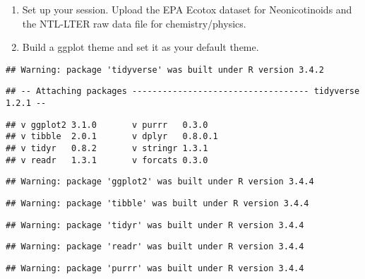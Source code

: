 \documentclass[]{article}
\newenvironment{Shaded}{\begin{snugshade}}{\end{snugshade}}
\newcommand{\KeywordTok}[1]{\textcolor[rgb]{0.13,0.29,0.53}{\textbf{#1}}}
\newcommand{\CommentTok}[1]{\textcolor[rgb]{0.56,0.35,0.01}{\textit{#1}}}
\newcommand{\NormalTok}[1]{#1}
\begin{document}
\begin{enumerate}
\def\labelenumi{\arabic{enumi}.}
\item
  Set up your session. Upload the EPA Ecotox dataset for Neonicotinoids
  and the NTL-LTER raw data file for chemistry/physics.
\item
  Build a ggplot theme and set it as your default theme.
\end{enumerate}

\begin{Shaded}
\end{Shaded}

\begin{verbatim}
## Warning: package 'tidyverse' was built under R version 3.4.2
\end{verbatim}

\begin{verbatim}
## -- Attaching packages ----------------------------------- tidyverse 1.2.1 --
\end{verbatim}

\begin{verbatim}
## v ggplot2 3.1.0       v purrr   0.3.0  
## v tibble  2.0.1       v dplyr   0.8.0.1
## v tidyr   0.8.2       v stringr 1.3.1  
## v readr   1.3.1       v forcats 0.3.0
\end{verbatim}

\begin{verbatim}
## Warning: package 'ggplot2' was built under R version 3.4.4
\end{verbatim}

\begin{verbatim}
## Warning: package 'tibble' was built under R version 3.4.4
\end{verbatim}

\begin{verbatim}
## Warning: package 'tidyr' was built under R version 3.4.4
\end{verbatim}

\begin{verbatim}
## Warning: package 'readr' was built under R version 3.4.4
\end{verbatim}

\begin{verbatim}
## Warning: package 'purrr' was built under R version 3.4.4
\end{verbatim}
\end{document}
